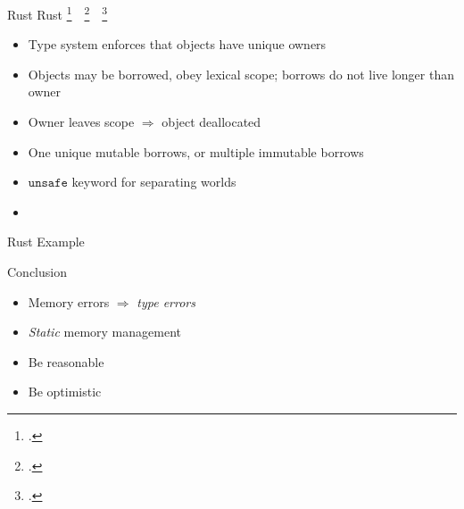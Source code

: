 \documentclass[aspectratio=169]{beamer}
\begin{document}
\begin{frame}{Rust}
    Rust \footcite{matsakis_rust_2014}\ \ \footcite{levy_ownership_2015}\ \ \footcite{jung_rustbelt:_2017}
    \begin{itemize}
        \item Type system enforces that objects have unique \alert{owners}
        \item Objects may be borrowed, obey lexical scope; borrows do not live longer than owner
        \item Owner leaves scope $\Rightarrow$ object \alert{deallocated}
        \item One \alert{unique} mutable borrows, or multiple immutable borrows %
        \item $\texttt{unsafe}$ keyword for separating worlds %
        \item {}
    \end{itemize}
\end{frame}


\begin{frame}{Rust Example}
\end{frame}

\begin{frame}{Conclusion}
    \begin{itemize}[<+->]
    \item Memory errors $\Rightarrow$ \emph{type errors}
    \item \emph{Static} memory management %
    \item Be reasonable %
    \item Be optimistic %
    \end{itemize}
\end{frame}
\end{document}
